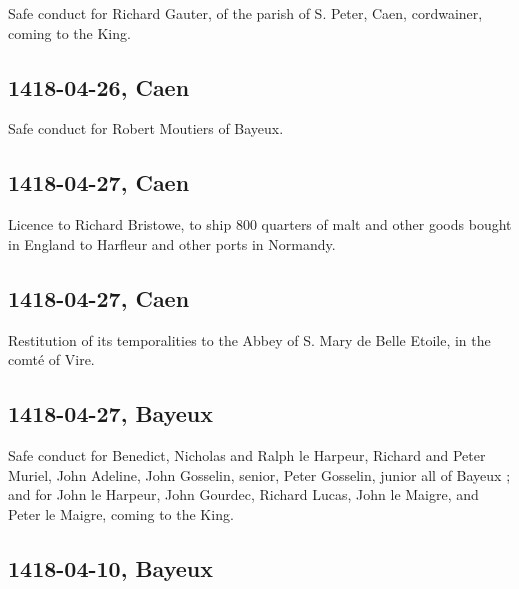 \documentclass[a4paper,12pt,twoside]{book}
\begin{document}
                     Safe conduct for Richard Gauter, of the parish of S. Peter, Caen, cordwainer, coming to the King.
                  
            \subsection{1418-04-26, Caen}
            
                     Safe conduct for Robert Moutiers of Bayeux.
                  
            \subsection{1418-04-27, Caen}
            
                     Licence to Richard Bristowe, to ship 800 quarters of malt and other goods bought in England to Harfleur and other ports in Normandy.
                  
            \subsection{1418-04-27, Caen}
            
                     Restitution of its temporalities to the Abbey of S. Mary de Belle Etoile, in the comté of Vire.
                  
            \subsection{1418-04-27, Bayeux}
            
                     Safe conduct for Benedict, Nicholas and Ralph le Harpeur, Richard and Peter Muriel, John Adeline, John Gosselin, senior, Peter Gosselin, junior all of Bayeux ; and for John le Harpeur, John Gourdec, Richard Lucas, John le Maigre, and Peter le Maigre, coming to the King.
                  
            \subsection{1418-04-10, Bayeux}
            
\end{document}
